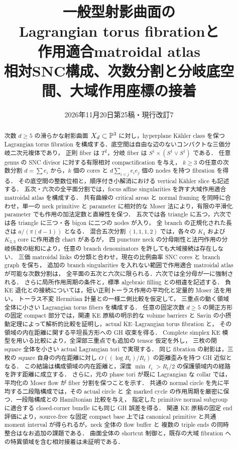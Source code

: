 \documentclass[11pt,a4paper]{article}
\title{一般型射影曲面の\\Lagrangian torus fibrationと\\作用適合matroidal atlas\\[0.5em]\large 相対SNC構成、次数分割と分岐底空間、大域作用座標の接着}
\author{}
\date{2026年11月20日\quad 第25稿・現行改訂7}
\begin{document}
\maketitle
\begin{abstract}
次数 $d\ge5$ の滑らかな射影曲面 $X_d\subset\mathbb P^3$ に対し，hyperplane Kähler class を保つ
Lagrangian torus fibration を構成する．底空間は自由な辺のないコンパクトな三価分岐二次元複体であり，
正則 fiber は $T^2$，分岐 fiber は $S^1\times(S^1\vee S^1)$ である．
任意 genus の SNC divisor に対する有限相対 compactification を与え，
$k\ge3$ の任意の次数分割 $d=\sum e_i$ から，$k$ 個の cores と
$d\sum_{i<j}e_i e_j$ 個の nodes を持つ fibration を得る．
その底空間の整数位相と，順序付き小解消における vertical Kähler slice も記述する．
五次・六次の全平面分割では，focus affine singularities を許す大域作用適合 matroidal atlas を構成する．
共有曲線の critical areas と normal framing を同時に合わせ，単一の neck primitive と
parameter に相対的な Moser 法により，有限の平滑化 parameter でも作用の加法定数と直線性を保つ．
五次では各 triangle に五つ，六次では各 triangle に三つ・各 bigon に二つの nodes が入り，
全 branch の正規化された長さは $a/(\pi(d-1))$ となる．
混合五次分割 $(1,1,1,2)$ では，各々の $K_4$ および $K_{3,3}$ core に作用適合 chart があるが，
四 puncture neck の分母剛性と法円作用の分岐係数の総和により，任意の branch denominators を許しても大域接続は存在しない．
三価 matroidal links の分類と合わせ，現在の比例曲率 SNC cores と branch graph を保ち，
追加の branch singularities を入れない範囲で作用適合 matroidal atlas が可能な次数分割は，
全平面の五次と六次に限られる．六次では全分母が一に強制される．
さらに局所作用周期の条件と，標準 algebraic filling との相違を記述する．
負 KE 退化との接続については，短い正則トーラス作用の平均化と定量的 Moser 法を用い，
トーラス不変 Hermitian 計量との一様二側比較を仮定して，
三重点の動く領域全体に小さい Lagrangian torus fibers を構成する．
任意の固定次数 $d\ge5$ の開正方形の固定 compact 部分では，関連 KE 原稿の明示的な volume barriers と
Savin の小摂動定理によって解析的比較を証明し，actual KE--Lagrangian torus fibration と，
その領域の内在距離に関する平坦長方形への GH 収束を得る．
Complete simplex KE 模型を用いる比較により，全深部三重点でも追加の tensor 仮定を外し，
三枚の閉 square 全体を小さい actual Lagrangian tori で実現する．
同じ fibration の射影は，三枚の square 自身の内在距離に対し
$O((\log R_t)/R_t)$ の距離歪みを持つ GH 近似となる．
この結論は構成領域の内在距離と，深度 $\min\ell_i>R_t/2$ の保護領域内の経路を許す距離に成立する．
さらに，元の phase tori が既に Lagrangian な collar では，平均化の Moser flow が
fiber 分割を保つことを示す．
共通の normal circle を先に平均する二段階構成では，その actual circle と
全 marked cycle の作用周期を厳密に保つ．一段階構成との Hamiltonian 比較を与え，
指定した primitive normal subgroup に適合する closed-corner bundle にも同じ GH 誤差を得る．
関連 KE 原稿の固定 end 評価により，source-free な固定 compact base 上では
canonical primitive と共通 moment interval が得られるが，neck 全体の flow buffer と
複数の triple ends の同時整合はなお追加の課題である．
曲面全体の shortcut 制御と，既存の大域 fibration への特異領域を含む相対接着は未証明である．
\end{abstract}
\end{document}
